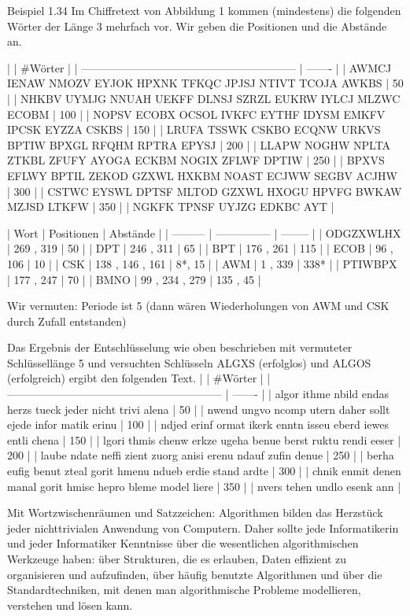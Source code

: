 \documentclass[a4paper]{article}
\begin{document}
\begin{multicols}{3}
Beispiel 1.34 Im Chiffretext von Abbildung 1 kommen (mindestens) die folgenden Wörter der Länge 3  mehrfach vor. Wir geben die Positionen und die Abstände an.

|                                                             | #Wörter |
| ----------------------------------------------------------- | ------- |
| AWMCJ IENAW NMOZV EYJOK HPXNK TFKQC JPJSJ NTIVT TCOJA AWKBS | 50      |
| NHKBV UYMJG NNUAH UEKFF DLNSJ SZRZL EUKRW IYLCJ MLZWC ECOBM | 100     |
| NOPSV ECOBX OCSOL IVKFC EYTHF IDYSM EMKFV IPCSK EYZZA CSKBS | 150     |
| LRUFA TSSWK CSKBO ECQNW URKVS BPTIW BPXGL RFQHM RPTRA EPYSJ | 200     |
| LLAPW NOGHW NPLTA ZTKBL ZFUFY AYOGA ECKBM NOGIX ZFLWF DPTIW | 250     |
| BPXVS EFLWY BPTIL ZEKOD GZXWL HXKBM NOAST ECJWW SEGBV ACJHW | 300     |
| CSTWC EYSWL DPTSF MLTOD GZXWL HXOGU HPVFG BWKAW MZJSD LTKFW | 350     |
| NGKFK TPNSF UYJZG EDKBC AYT                                 |

| Wort      | Positionen      | Abstände |
| --------- | --------------- | -------- |
| ODGZXWLHX | 269 , 319       | 50       |
| DPT       | 246 , 311       | 65       |
| BPT       | 176 , 261       | 115      |
| ECOB      | 96 , 106        | 10       |
| CSK       | 138 , 146 , 161 | 8*, 15   |
| AWM       | 1 , 339         | 338*     |
| PTIWBPX   | 177 , 247       | 70       |
| BMNO      | 99 , 234 , 279  | 135 , 45 |

Wir vermuten: Periode ist 5 (dann wären Wiederholungen von AWM und CSK durch Zufall entstanden)

Das Ergebnis der Entschlüsselung wie oben beschrieben mit vermuteter Schlüssellänge 5 und versuchten Schlüsseln ALGXS (erfolglos) und ALGOS (erfolgreich) ergibt den folgenden Text.
|                                                             | #Wörter |
| ----------------------------------------------------------- | ------- |
| algor ithme nbild endas herzs tueck jeder nicht trivi alena | 50      |
| nwend ungvo ncomp utern daher sollt ejede infor matik erinu | 100     |
| ndjed erinf ormat ikerk enntn isseu eberd iewes entli chena | 150     |
| lgori thmis chenw erkze ugeha benue berst ruktu rendi eeser | 200     |
| laube ndate neffi zient zuorg anisi erenu ndauf zufin denue | 250     |
| berha eufig benut zteal gorit hmenu ndueb erdie stand ardte | 300     |
| chnik enmit denen manal gorit hmisc hepro bleme model liere | 350     |
| nvers tehen undlo esenk ann                                 |

Mit Wortzwischenräumen und Satzzeichen:
Algorithmen bilden das Herzstück jeder nichttrivialen Anwendung von Computern. Daher sollte jede Informatikerin und jeder Informatiker Kenntnisse über die wesentlichen algorithmischen Werkzeuge haben: über Strukturen, die es erlauben, Daten effizient zu organisieren und aufzufinden, über häufig benutzte Algorithmen und über die Standardtechniken, mit denen man algorithmische Probleme modellieren, verstehen und lösen kann.


\end{multicols}
\end{document}
